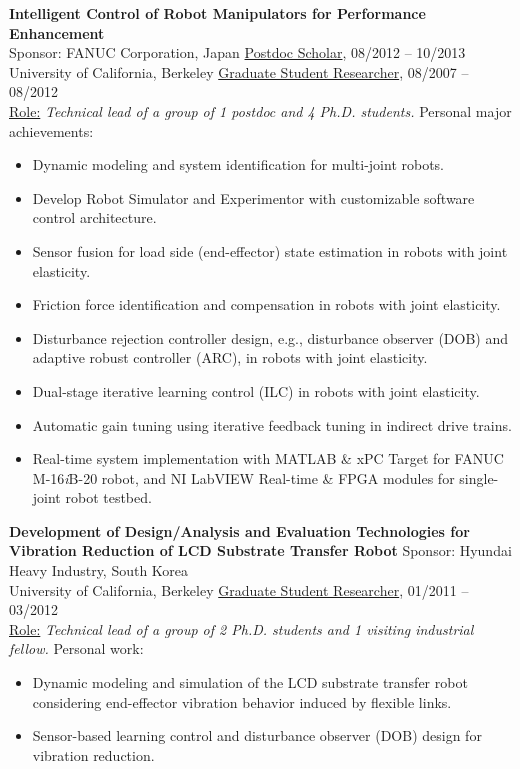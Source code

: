 \documentclass{res}
\begin{document}
\begin{resume}
{\bf Intelligent Control of Robot Manipulators for Performance Enhancement}  \\
Sponsor: FANUC Corporation, Japan \hfill  \underline{Postdoc Scholar}, 08/2012 -- 10/2013\\
University of California, Berkeley  \hfill \underline{Graduate Student Researcher}, 08/2007 -- 08/2012\\
\underline{Role:} \emph{Technical lead of a group of 1 postdoc and 4 Ph.D. students.} Personal major achievements:
\begin{itemize}
	\item Dynamic modeling and system identification for multi-joint robots.
	\item Develop Robot Simulator and Experimentor with customizable software control architecture.
	\item Sensor fusion for load side (end-effector) state estimation in robots with joint elasticity.
	\item Friction force identification and compensation in robots with joint elasticity.
	\item Disturbance rejection controller design, e.g., disturbance observer (DOB) and adaptive robust controller (ARC), in robots with joint elasticity.
	\item Dual-stage iterative learning control (ILC) in robots with joint elasticity.
	\item Automatic gain tuning using iterative feedback tuning in indirect drive trains.
	\item Real-time system implementation with MATLAB \& xPC Target for FANUC M-16\emph{i}B-20 robot, and NI LabVIEW Real-time \& FPGA modules for single-joint robot testbed.
\end{itemize}

{\bf Development of Design/Analysis and Evaluation Technologies for Vibration Reduction of LCD Substrate Transfer Robot}
\hfill Sponsor: Hyundai Heavy Industry, South Korea \\
University of California, Berkeley  \hfill \underline{Graduate Student Researcher}, 01/2011 -- 03/2012\\
\underline{Role:} \emph{Technical lead of a group of 2 Ph.D. students and 1 visiting industrial fellow.} Personal work:
\begin{itemize}
	\item Dynamic modeling and simulation of the LCD substrate transfer robot considering end-effector vibration behavior induced by flexible links.
	\item Sensor-based learning control and disturbance observer (DOB) design for vibration reduction.
\end{itemize}


\end{resume}
\end{document}
